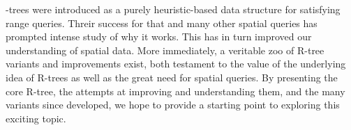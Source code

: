 \rbase-trees were introduced as a purely heuristic-based data structure for satisfying range queries.
Threir success for that and many other spatial queries has prompted intense study of why it works.
This has in turn improved our understanding of spatial data.
More immediately, a veritable zoo of R-tree variants and improvements exist, both testament to the value of the underlying idea of R-trees as well as the great need for spatial queries.
By presenting the core R-tree, the attempts at improving and understanding them, and the many variants since developed, we hope to provide a starting point to exploring this exciting topic.

